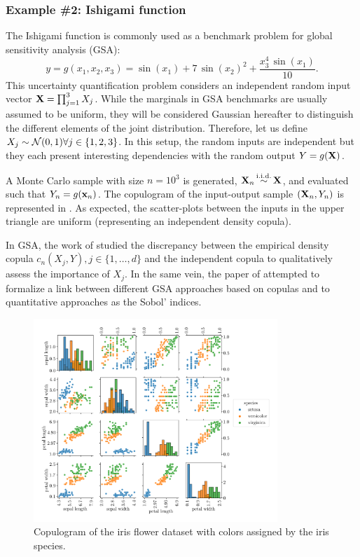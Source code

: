\subsubsection{Example \#2: Ishigami function}

The Ishigami function is commonly used as a benchmark problem for global sensitivity analysis (GSA): 
\begin{equation}
    y = g(x_1, x_2, x_3) = \sin(x_1) + 7 \, \sin(x_2)^2 + \frac{x_3^4 \, \sin(x_1)}{10}.
\end{equation}
This uncertainty quantification problem considers an independent random input vector ${\bf X}=\prod_{j=1}^{3} X_j$. 
While the marginals in GSA benchmarks are usually assumed to be uniform, they will be considered Gaussian hereafter to distinguish the different elements of the joint distribution. 
Therefore, let us define $X_j\sim \mathcal{N}(0, 1) \forall j \in \{1, 2, 3\}$. 
In this setup, the random inputs are independent but they each present interesting dependencies with the random output $Y=g({\bf X})$.

A Monte Carlo sample with size $n=10^3$ is generated, ${\bf X}_n \mathop{\sim}\limits^{\mathrm{i.i.d.}} {\bf X}$, and evaluated such that $Y_n=g({\bf x}_n)$.  
The copulogram of the input-output sample $({\bf X}_n, Y_n)$ is represented in . 
As expected, the scatter-plots between the inputs in the upper triangle are uniform (representing an independent density copula). 

In GSA, the work of \citet{poczos_2012_copulaMMD} studied the discrepancy between the empirical density copula $c_n(X_j, Y), j \in \{1, \dots, d\}$ and the independent copula to qualitatively assess the importance of $X_j$.  
In the same vein, the paper of \citet{plischke_2019_copulaGSA} attempted to formalize a link between different GSA approaches based on copulas and to quantitative approaches as the Sobol' indices. 

\begin{figure}
    \centering
    \quad\qquad\qquad\includegraphics[width=0.82\textwidth]{../numerical_experiments/chapter3/figures/iris_copulogram.png}
    \caption{Copulogram of the iris flower dataset with colors assigned by the iris species.}
    \label{fig:iris_copulogram}
\end{figure}

